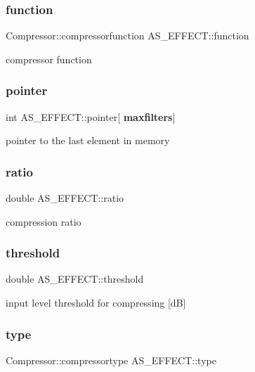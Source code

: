 \subsubsection{function}
{\footnotesize\ttfamily Compressor\+::compressorfunction A\+S\+\_\+\+E\+F\+F\+E\+C\+T\+::function\hspace{0.3cm}{\ttfamily [private]}}

compressor function \mbox{\label{class_a_s___e_f_f_e_c_t_a4cf9463559a989c067f2e5309eaf9c15}} 
\subsubsection{pointer}
{\footnotesize\ttfamily int A\+S\+\_\+\+E\+F\+F\+E\+C\+T\+::pointer[\textbf{ maxfilters}]\hspace{0.3cm}{\ttfamily [private]}}

pointer to the last element in memory \mbox{\label{class_a_s___e_f_f_e_c_t_a53a0ebc9c6ee46bbdb986196c3c7cd61}} 
\subsubsection{ratio}
{\footnotesize\ttfamily double A\+S\+\_\+\+E\+F\+F\+E\+C\+T\+::ratio\hspace{0.3cm}{\ttfamily [private]}}

compression ratio \mbox{\label{class_a_s___e_f_f_e_c_t_ae288a80c1f49857058057c9deec33985}} 
\subsubsection{threshold}
{\footnotesize\ttfamily double A\+S\+\_\+\+E\+F\+F\+E\+C\+T\+::threshold\hspace{0.3cm}{\ttfamily [private]}}

input level threshold for compressing [dB] \mbox{\label{class_a_s___e_f_f_e_c_t_a8a02b0d4a60f4dac5872bc28bf4597e5}} 
\subsubsection{type}
{\footnotesize\ttfamily Compressor\+::compressortype A\+S\+\_\+\+E\+F\+F\+E\+C\+T\+::type\hspace{0.3cm}{\ttfamily [private]}}

